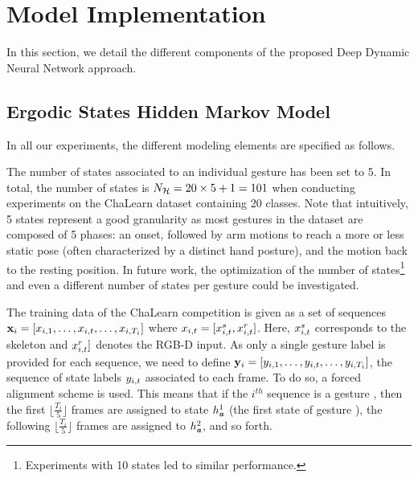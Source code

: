 

\section{Model Implementation}
\label{sec:ModelImplementation}

In this section, we detail the different components of the proposed Deep Dynamic Neural Network approach.

\subsection{Ergodic States Hidden Markov Model}

In all our experiments, the different modeling elements are specified as follows.

The number of states \nsig{} associated to an individual gesture has been set to 5.
In total, the number of states is $N_{\mathcal{H}} = 20 \times 5 + 1 = 101$
when conducting  experiments on the ChaLearn dataset containing 20 classes.
%
Note that intuitively, 5 states represent a good granularity as
most gestures in the dataset are composed of 5 phases: an onset, followed by arm motions to reach a more or less static pose (often characterized by a distinct hand posture), and the motion back to the resting position.
%
In future work, the optimization of the number of states\footnote{Experiments with 10 states led to similar performance.} and even a different number of states per gesture could be investigated.
%


The training data of the ChaLearn competition is given as a set of sequences
$\mathbf x_i=[x_{i,1}, \ldots,x_{i,t},\ldots, x_{i,T_i}]$
where $x_{i,t}=[x_{i,t}^s, x_{i,t}^r]$. Here,  $x_{i,t}^s$ corresponds to the skeleton and $x_{i,t}^r]$ denotes the RGB-D input.
%
As only a single gesture label is provided for each sequence, we need to define
$\mathbf y_i=[y_{i,1}, \ldots,y_{i,t},\ldots, y_{i,T_i}]$,
the sequence of state labels $y_{i,t}$ associated to each frame.
%
To do so, a forced alignment scheme is used. This means that if the $i^{th}$ sequence is a gesture \gesturea{}, then the first $\lfloor \frac{T_i}{5} \rfloor$ frames are assigned to state $h_{\textbf{\emph{a}}}^1$ (the first state of gesture \gesturea{}),
the following $\lfloor \frac{T_i}{5} \rfloor$ frames are assigned to $h_{\textbf{\emph{a}}}^2$, and so forth.

